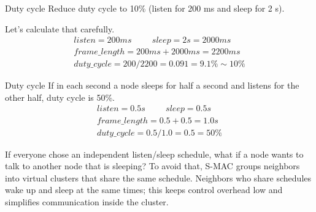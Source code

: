 \begin{Example}{Duty cycle}{}
Reduce duty cycle to 10\% (listen for 200 ms and sleep for 2 s).

Let’s calculate that carefully. 
\begin{align*}
listen = 200ms\hspace{1cm}sleep = 2 s = 2000 ms\\
frame\_length = 200 ms + 2000 ms = 2200 ms\\
duty\_cycle = 200 / 2200 = 0.091 = 9.1\%\sim 10\%
\end{align*}
\end{Example}

\begin{Example}{Duty cycle}{}
If in each second a node sleeps for half a second and listens for the other half, duty cycle is 50\%.
\begin{align*}
listen = 0.5 s\hspace{1cm}sleep = 0.5 s\\
frame\_length = 0.5 + 0.5 = 1.0 s\\
duty\_cycle = 0.5 / 1.0 = 0.5 = 50\%
\end{align*}
\end{Example}

If everyone chose an independent listen/sleep schedule, what if a node wants to talk to another node that is sleeping? To avoid that, S-MAC groups neighbors into virtual clusters that share the same schedule. Neighbors who share schedules wake up and sleep at the same times; this keeps control overhead low and simplifies communication inside the cluster.

